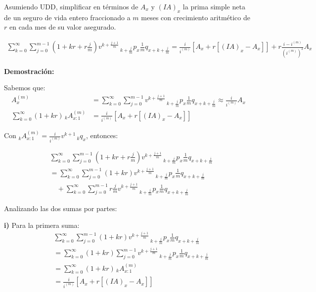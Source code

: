Asumiendo UDD, simplificar en términos de $A_x$ y $(IA)_x$ la prima simple neta de un seguro de vida entero fraccionado a $m$ meses con crecimiento aritmético de $r$ en cada mes de su valor asegurado. 

\begin{align}
\sum_{k=0}^{\infty} \sum_{j=0}^{m-1} \left(1 + kr + r\frac{j}{m}\right) v^{k+\frac{j+1}{m}} \,_{k+\frac{j}{m}}p_x \frac{1}{m} q_{x+k+\frac{j}{m}} = \frac{i}{i^{(m)}}[A_x + r[(IA)_x - A_x]] + r\frac{i - i^{(m)}}{(i^{(m)})^2} A_x
\end{align}

\textbf{Demostración:}

Sabemos que:
\begin{align}
A_x^{(m)} &= \sum_{k=0}^{\infty} \sum_{j=0}^{m-1} v^{k+\frac{j+1}{m}} \,_{k+\frac{j}{m}}p_x \frac{1}{m} q_{x+k+\frac{j}{m}} \approx \frac{i}{i^{(m)}} A_x \\
\sum_{k=0}^{\infty} (1 + kr) \,_k A_{x:1}^{(m)} &= \frac{i}{i^{(m)}} [A_x + r[(IA)_x - A_x]]
\end{align}

Con $_k A_{x:1}^{(m)} = \frac{i}{i^{(m)}} v^{k+1} \,_k q_x$, entonces:

\begin{align}
&\sum_{k=0}^{\infty} \sum_{j=0}^{m-1} \left(1 + kr + r\frac{j}{m}\right) v^{k+\frac{j+1}{m}} \,_{k+\frac{j}{m}}p_x \frac{1}{m} q_{x+k+\frac{j}{m}} \\
&= \sum_{k=0}^{\infty} \sum_{j=0}^{m-1} (1 + kr) v^{k+\frac{j+1}{m}} \,_{k+\frac{j}{m}}p_x \frac{1}{m} q_{x+k+\frac{j}{m}} \\
&\quad + \sum_{k=0}^{\infty} \sum_{j=0}^{m-1} r\frac{j}{m} v^{k+\frac{j+1}{m}} \,_{k+\frac{j}{m}}p_x \frac{1}{m} q_{x+k+\frac{j}{m}}
\end{align}

Analizando las dos sumas por partes:

\textbf{i)} Para la primera suma:
\begin{align}
&\sum_{k=0}^{\infty} \sum_{j=0}^{m-1} (1 + kr) v^{k+\frac{j+1}{m}} \,_{k+\frac{j}{m}}p_x \frac{1}{m} q_{x+k+\frac{j}{m}} \\
&= \sum_{k=0}^{\infty} (1 + kr) \sum_{j=0}^{m-1} v^{k+\frac{j+1}{m}} \,_{k+\frac{j}{m}}p_x \frac{1}{m} q_{x+k+\frac{j}{m}} \\
&= \sum_{k=0}^{\infty} (1 + kr) \,_k A_{x:1}^{(m)} \\
&= \frac{i}{i^{(m)}} [A_x + r[(IA)_x - A_x]]
\end{align}

